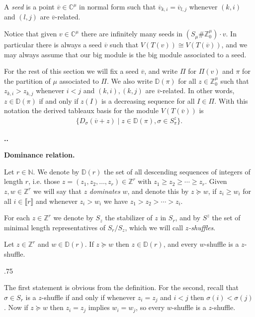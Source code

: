 \documentclass[11pt,fleqn]{amsart}
\makeatletter
\renewcommand\thesection{\arabic{section}}
\renewcommand\proofname{Proof}
\renewenvironment{proof}[1][\textit{\proofname}]{\par
 \pushQED{\qed}%
 \normalfont \topsep.75\paraskip\relax
 \trivlist
 \item[\hskip\labelsep
 \itshape
 #1\@addpunct{.}]\ignorespaces
}{%
 \popQED\endtrivlist\@endpefalse
}
\newcounter{para}[section]
\renewcommand\thepara{\thesection.\arabic{para}}
\def\paragraph{%
 \noindent
 \refstepcounter{para}%
 \textbf{\thepara.}\hspace{1ex}%
}
\newcommand\about[1]{%
 {\bfseries#1.}%
}
\newcommand\NN{\mathbb N}
\newcommand\CC{\mathbb C}
\newcommand\ZZ{\mathbb Z}
\newcommand\vv{\overline{v}}
\newcommand\interval[1]{\llbracket #1 \rrbracket}
\newcommand\Desc[1]{\mathbb D(#1)}
\makeatother
\begin{document}
\begin{Definition}
A \emph{seed} is a point $\vv \in \CC^\mu$ in normal form such that 
$\vv_{k,i} = \vv_{l,j}$ whenever $(k,i)$ and $(l,j)$ are $\vv$-related.
\end{Definition}
Notice that given $v \in \CC^\mu$ there are infinitely many seeds in
$(S_\mu \# \ZZ^\mu_0) \cdot v$. In particular there is always a seed $\vv$ 
such that $V(T(v)) \cong V(T(\vv))$, and we may always assume that our big 
module is the big module associated to a seed. 

For the rest of this section we will fix a seed $\vv$, and write $\Pi$ for 
$\Pi(v)$ and $\pi$ for the partition of $\mu$ associated to $\Pi$. We also 
write $\Desc{\pi}$ for all $z \in \ZZ^\mu_0$ such that $z_{k,i} > z_{k,j}$
whenever $i<j$ and $(k,i), (k,j)$ are $\vv$-related. In other words, $z \in
\Desc{\pi}$ if and only if $z(I)$ is a decreasing sequence for all $I \in
\Pi$. With this notation the derived tableaux basis for the module 
$V(T(\vv))$ is
\begin{align*}
\{D_\sigma(\vv + z) \mid z \in \Desc{\pi}, \sigma \in S_\pi^z\}.
\end{align*}

\paragraph
\about{Dominance relation}
\label{dominance-relation}
Let $r \in \NN$. We denote by $\Desc{r}$ the set of all descending sequences
of integers of length $r$, i.e. those $z = (z_1, z_2, \ldots, z_r) \in \ZZ^r$
with $z_1 \geq z_2 \geq \cdots \geq z_r$. Given $z, w \in \ZZ^r$ we will say
that $z$ \emph{dominates} $w$, and denote this by $z \succeq w$, if $z_i \geq 
w_i$ for all $i \in \interval{r}$ and whenever $z_i > w_i$ we have $z_1 > z_2
> \cdots > z_i$. 

For each $z \in \ZZ^r$ we denote by $S_z$ the stabilizer of $z$ in $S_r$, and
by $S^z$ the set of minimal length representatives of $S_r/S_z$, which we will
call \emph{$z$-shuffles}. 
\begin{Lemma*}
Let $z \in \ZZ^r$ and $w \in \Desc{r}$. If $z \succeq w$ then $z \in 
\Desc{r}$, and every $w$-shuffle is a $z$-shuffle.
\end{Lemma*}
\begin{proof}
The first statement is obvious from the definition. For the second, recall that
$\sigma \in S_r$ is a $z$-shuffle if and only if whenever $z_i = z_j$ and 
$i<j$ then $\sigma(i) < \sigma(j)$. Now if $z \succeq w$ then $z_i = z_j$
implies $w_i = w_j$, so every $w$-shuffle is a $z$-shuffle.
\end{proof}
\end{document}
